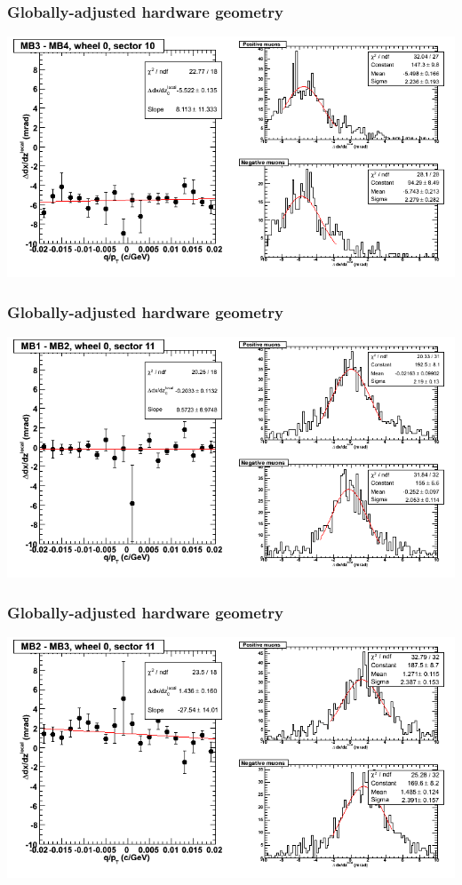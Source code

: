 \documentclass[compress]{beamer}
\begin{document}
\begin{frame}
\frametitle{Globally-adjusted hardware geometry}
\includegraphics[width=\linewidth]{NOV4_segdiffs_HW/dt13_slope_C_10_34.png}
\end{frame}

\begin{frame}
\frametitle{Globally-adjusted hardware geometry}
\includegraphics[width=\linewidth]{NOV4_segdiffs_HW/dt13_slope_C_11_12.png}
\end{frame}

\begin{frame}
\frametitle{Globally-adjusted hardware geometry}
\includegraphics[width=\linewidth]{NOV4_segdiffs_HW/dt13_slope_C_11_23.png}
\end{frame}
\end{document}
